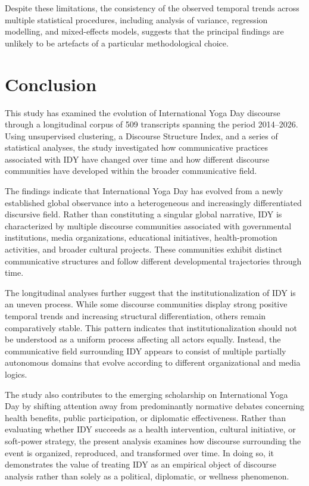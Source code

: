 \documentclass[11pt]{article}
\begin{document}
Despite these limitations, the consistency of the observed temporal trends across multiple statistical procedures,
including analysis of variance, regression modelling, and mixed-effects models, suggests that the principal findings are
unlikely to be artefacts of a particular methodological choice.


\section{Conclusion}



This study has examined the evolution of International Yoga Day discourse through a longitudinal corpus of 509
transcripts spanning the period 2014--2026. Using unsupervised clustering, a Discourse Structure Index, and a series of
statistical analyses, the study investigated how communicative practices associated with IDY have changed over time and
how different discourse communities have developed within the broader communicative field.


The findings indicate that International Yoga Day has evolved from a newly established global observance into a
heterogeneous and increasingly differentiated discursive field. Rather than constituting a singular global narrative,
IDY is characterized by multiple discourse communities associated with governmental institutions, media organizations,
educational initiatives, health-promotion activities, and broader cultural projects. These communities exhibit distinct
communicative structures and follow different developmental trajectories through time.


The longitudinal analyses further suggest that the institutionalization of IDY is an uneven process. While some
discourse communities display strong positive temporal trends and increasing structural differentiation, others remain
comparatively stable. This pattern indicates that institutionalization should not be understood as a uniform process
affecting all actors equally. Instead, the communicative field surrounding IDY appears to consist of multiple partially
autonomous domains that evolve according to different organizational and media logics.


The study also contributes to the emerging scholarship on International Yoga Day by shifting attention away from
predominantly normative debates concerning health benefits, public participation, or diplomatic effectiveness. Rather
than evaluating whether IDY succeeds as a health intervention, cultural initiative, or soft-power strategy, the present
analysis examines how discourse surrounding the event is organized, reproduced, and transformed over time. In doing so,
it demonstrates the value of treating IDY as an empirical object of discourse analysis rather than solely as a
political, diplomatic, or wellness phenomenon.
\end{document}
